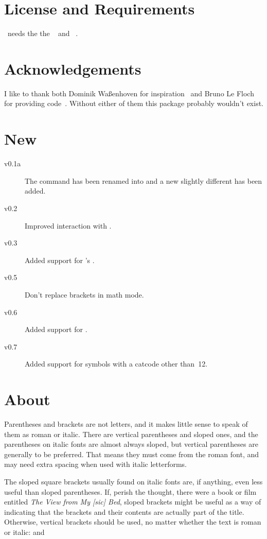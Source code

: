 \documentclass[load-preamble+]{cnltx-doc}
\begin{document}
\section{License and Requirements}
\license

\embrac\ needs the the ~\cite{bnd:l3kernel} and
~\cite{bnd:l3packages}.

\section{Acknowledgements}
I like to thank both Dominik Waßenhoven for inspiration~\cite{dtk12-dw} and
Bruno Le Floch for providing code~\cite{lefloch11}. Without either of them this
package probably wouldn't exist.

\section{New}
\begin{description}
  \item[v0.1a] The command  has been renamed into
     and a new slightly different  has been added.
  \item[v0.2] Improved interaction with .
  \item[v0.3] Added support for 's .
  \item[v0.5] Don't replace brackets in math mode.
  \item[v0.6] Added support for .
  \item[v0.7] Added support for symbols with a catcode other than~12.
\end{description}

\section{About}\label{sec:about}
\begin{cnltxquote}
  Parentheses and brackets are not letters, and it makes little sense to speak
  of them as roman or italic.  There are vertical parentheses and sloped ones,
  and the parentheses on italic fonts are almost always sloped, but vertical
  parentheses are generally to be preferred.  That means they must come from
  the roman font, and may need extra spacing when used with italic
  letterforms.
 
  The sloped square brackets usually found on italic fonts are, if anything,
  even less useful than sloped parentheses.  If, perish the thought, there
  were a book or film entitled \emph*{The View from My [sic] Bed}, sloped
  brackets might be useful as a way of indicating that the brackets and their
  contents are actually part of the title.  Otherwise, vertical brackets
  should be used, no matter whether the text is roman or italic:
   and 
\end{cnltxquote}
\end{document}
